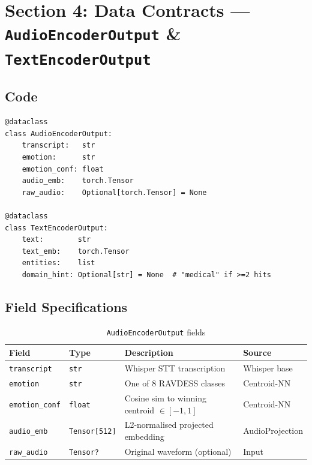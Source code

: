\documentclass[12pt,a4paper]{article}
\theoremstyle{definition}
\theoremstyle{remark}
\begin{document}
\section{Section 4: Data Contracts — \texttt{AudioEncoderOutput} \& \texttt{TextEncoderOutput}}

\subsection{Code}

\begin{lstlisting}[caption={Output dataclass contracts}]
@dataclass
class AudioEncoderOutput:
    transcript:   str
    emotion:      str
    emotion_conf: float
    audio_emb:    torch.Tensor
    raw_audio:    Optional[torch.Tensor] = None

@dataclass
class TextEncoderOutput:
    text:        str
    text_emb:    torch.Tensor
    entities:    list
    domain_hint: Optional[str] = None  # "medical" if >=2 hits
\end{lstlisting}

\subsection{Field Specifications}

\begin{table}[H]
\centering
\caption{\texttt{AudioEncoderOutput} fields}
\begin{tabularx}{\textwidth}{llXl}
\toprule
Field & Type & Description & Source \\
\midrule
\texttt{transcript}   & \texttt{str} & Whisper STT transcription & Whisper base \\
\texttt{emotion}      & \texttt{str} & One of 8 RAVDESS classes & Centroid-NN \\
\texttt{emotion\_conf}& \texttt{float} & Cosine sim to winning centroid $\in [-1,1]$ & Centroid-NN \\
\texttt{audio\_emb}   & \texttt{Tensor[512]} & L2-normalised projected embedding & AudioProjection \\
\texttt{raw\_audio}   & \texttt{Tensor?} & Original waveform (optional) & Input \\
\bottomrule
\end{tabularx}
\end{table}
\end{document}
